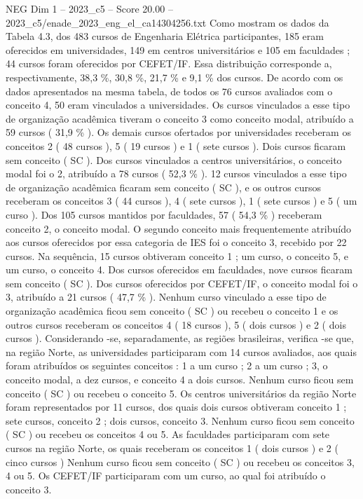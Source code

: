 \begin{textsample}{NEG Dim 1 – 2023\_c5 – Score 20.00 – 2023\_c5/enade\_2023\_eng\_el\_ca14304256.txt}
Como mostram os dados da Tabela 4.3, dos 483 cursos de Engenharia Elétrica participantes, 185 eram oferecidos em universidades, 149 em centros universitários e 105 em faculdades ; 44 cursos foram oferecidos por CEFET/IF.
Essa distribuição corresponde a, respectivamente, 38,3 \%, 30,8 \%, 21,7 \% e 9,1 \% dos cursos.
De acordo com os dados apresentados na mesma tabela, de todos os 76 cursos avaliados com o conceito 4, 50 eram vinculados a universidades.
Os cursos vinculados a esse tipo de organização acadêmica tiveram o conceito 3 como conceito modal, atribuído a 59 cursos ( 31,9 \% ).
Os demais cursos ofertados por universidades receberam os conceitos 2 ( 48 cursos ), 5 ( 19 cursos ) e 1 ( sete cursos ).
Dois cursos ficaram sem conceito ( SC ).
Dos cursos vinculados a centros universitários, o conceito modal foi o 2, atribuído a 78 cursos ( 52,3 \% ). 12 cursos vinculados a esse tipo de organização acadêmica ficaram sem conceito ( SC ), e os outros cursos receberam os conceitos 3 ( 44 cursos ), 4 ( sete cursos ), 1 ( sete cursos ) e 5 ( um curso ).
Dos 105 cursos mantidos por faculdades, 57 ( 54,3 \% ) receberam conceito 2, o conceito modal.
O segundo conceito mais frequentemente atribuído aos cursos oferecidos por essa categoria de IES foi o conceito 3, recebido por 22 cursos.
Na sequência, 15 cursos obtiveram conceito 1 ; um curso, o conceito 5, e um curso, o conceito 4.
Dos cursos oferecidos em faculdades, nove cursos ficaram sem conceito ( SC ).
Dos cursos oferecidos por CEFET/IF, o conceito modal foi o 3, atribuído a 21 cursos ( 47,7 \% ).
Nenhum curso vinculado a esse tipo de organização acadêmica ficou sem conceito ( SC ) ou recebeu o conceito 1 e os outros cursos receberam os conceitos 4 ( 18 cursos ), 5 ( dois cursos ) e 2 ( dois cursos ).
Considerando -se, separadamente, as regiões brasileiras, verifica -se que, na região Norte, as universidades participaram com 14 cursos avaliados, aos quais foram atribuídos os seguintes conceitos : 1 a um curso ; 2 a um curso ; 3, o conceito modal, a dez cursos, e conceito 4 a dois cursos.
Nenhum curso ficou sem conceito ( SC ) ou recebeu o conceito 5.
Os centros universitários da região Norte foram representados por 11 cursos, dos quais dois cursos obtiveram conceito 1 ; sete cursos, conceito 2 ; dois cursos, conceito 3.
Nenhum curso ficou sem conceito ( SC ) ou recebeu os conceitos 4 ou 5.
As faculdades participaram com sete cursos na região Norte, os quais receberam os conceitos 1 ( dois cursos ) e 2 ( cinco cursos ) Nenhum curso ficou sem conceito ( SC ) ou recebeu os conceitos 3, 4 ou 5.
Os CEFET/IF participaram com um curso, ao qual foi atribuído o conceito 3.

\end{textsample}
